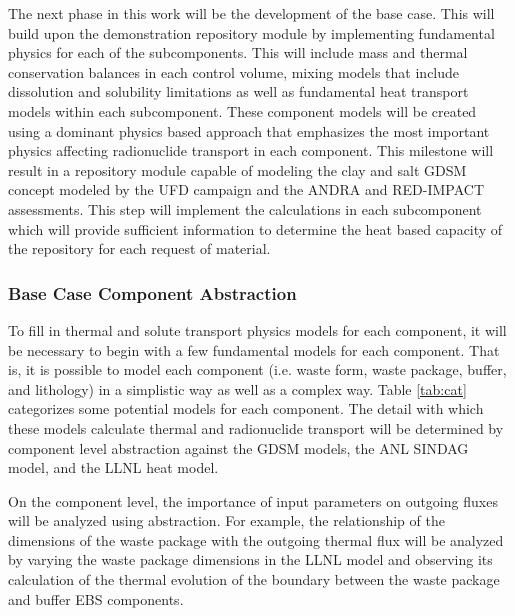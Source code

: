 
The next phase in this work will be the development of the base case.  This 
will build upon the demonstration repository module by implementing fundamental
physics for each of the subcomponents.  This will include mass and thermal 
conservation balances in each control volume, mixing models that include 
dissolution and solubility limitations as well as fundamental heat transport
models within each subcomponent. These component models will be created using a 
dominant physics based approach that emphasizes the most important physics 
affecting radionuclide transport in each component. This milestone will result 
in a repository module capable of modeling the clay and salt \gls{GDSM} concept 
modeled by the \gls{UFD} campaign and the \gls{ANDRA} and RED-IMPACT  assessments.
This step will implement the calculations in each subcomponent which 
will provide sufficient information to determine the heat based capacity of 
the repository for each request of material. 

\subsubsection{Base Case Component Abstraction}


To fill in thermal and solute transport physics models for each component, it 
will be necessary to begin with a few fundamental models for each component. 
That is, it is possible to model each component (i.e. waste form, waste package, 
buffer, and lithology) in a simplistic way as well as a complex way. Table 
\ref{tab:cat} categorizes some potential models for each component. The detail 
with which these models calculate thermal and radionuclide transport will be 
determined by component level abstraction against the \gls{GDSM} models, the 
\gls{ANL} \gls{SINDAG} model, and the \gls{LLNL} heat model.


  


On the component level, the importance of input parameters on outgoing fluxes 
will be analyzed using abstraction. For example, the relationship of the 
dimensions  of the waste package with the outgoing thermal flux 
will be analyzed by varying the waste package dimensions in the \gls{LLNL} 
model and observing its calculation of the thermal evolution of the boundary 
between the waste package and buffer \gls{EBS} components.

